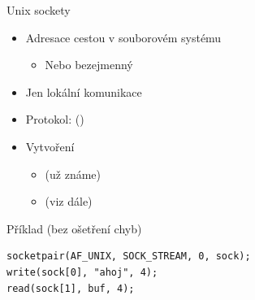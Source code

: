 \begin{frame}[fragile]{Unix sockety}

  \begin{itemize}
    \item Adresace cestou v souborovém systému
    \begin{itemize}
      \item Nebo bezejmenný
    \end{itemize}

    \pause

    \item Jen lokální komunikace

    \pause

    \item Protokol:  ()

    \pause

    \item Vytvoření
    \begin{itemize}
      \item {} (už známe)
      \item {} (viz dále)
    \end{itemize}
  \end{itemize}


  \begin{block}{Příklad (bez ošetření chyb)}
  \begin{lstlisting}
socketpair(AF_UNIX, SOCK_STREAM, 0, sock);
write(sock[0], "ahoj", 4);
read(sock[1], buf, 4);
  \end{lstlisting}
  \end{block}

\end{frame}

